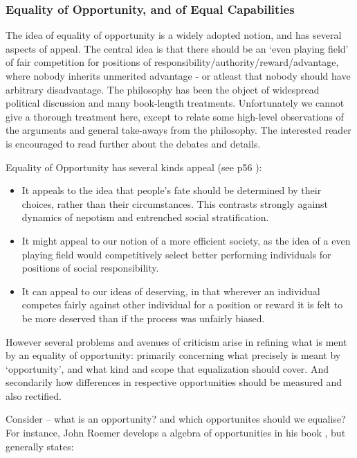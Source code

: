 \documentclass{article}
\begin{document}
\subsubsection{Equality of Opportunity, and of Equal Capabilities}

The idea of equality of opportunity is a widely adopted notion, and has several aspects of appeal.
The central idea is that there should be an `even playing field' of fair competition for positions of responsibility/authority/reward/advantage, where nobody inherits unmerited advantage - or atleast that nobody should have arbitrary disadvantage.
The philosophy has been the object of widespread political discussion and many book-length treatments.\cite{roemer_equalityofopportunity,mason2006levelling}
Unfortunately we cannot give a thorough treatment here, except to relate some high-level observations of the arguments and general take-aways from the philosophy. The interested reader is encouraged to read further about the debates and details.

Equality of Opportunity has several kinds appeal (see p56 \cite{kymlicka2002contemporary}):
\begin{itemize}
    \item It appeals to the idea that people's fate should be determined by their choices, rather than their circumstances. This contrasts strongly against dynamics of nepotism and entrenched social stratification.
    \item It might appeal to our notion of a more efficient society, as the idea of a even playing field would competitively select better performing individuals for positions of social responsibility.
    \item It can appeal to our ideas of deserving, in that wherever an individual competes fairly against other individual for a position or reward it is felt to be more deserved than if the process was unfairly biased.
\end{itemize}

However several problems and avenues of criticism arise in refining what is ment by an equality of opportunity: primarily concerning what precisely is meant by `opportunity', and what kind and scope that equalization should cover. And secondarily how differences in respective opportunities should be measured and also rectified.

Consider -- what is an opportunity? and which opportunites should we equalise?
For instance, John Roemer develops a algebra of opportunities in his book \cite{roemer_equalityofopportunity}, but generally states:
\end{document}
